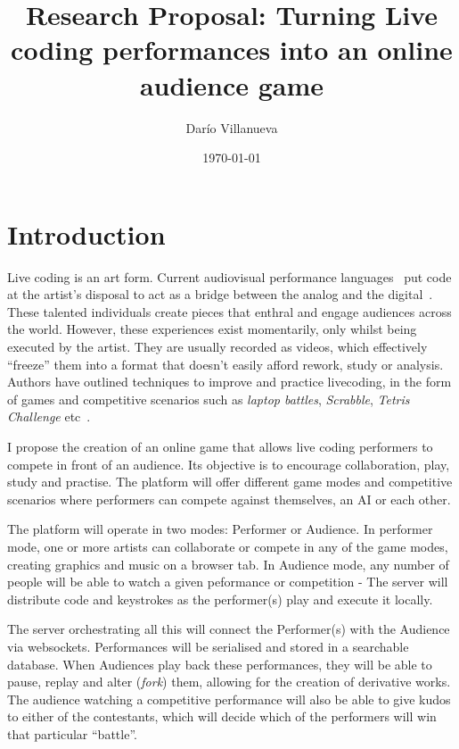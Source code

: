 \documentclass[12pt]{article}
\title{Research Proposal: Turning Live coding performances into an online audience game}
\date{\today}
\author{Darío Villanueva}
\begin{document}
\maketitle

\section*{Introduction}

Live coding is an art form. Current audiovisual performance languages~\cite{gibber, tidal, supercollider, livecodelab,fluxus} put code at the artist's disposal to act as a bridge between the analog and the digital~\cite{textural-x}. These talented individuals create pieces that enthral and engage audiences across the world. However, these experiences exist momentarily, only whilst being executed by the artist. They are usually recorded as videos, which effectively ``freeze'' them into a format that doesn't easily afford rework, study or analysis. Authors have outlined techniques to improve and practice livecoding, in the form of games and competitive scenarios such as \emph{laptop battles}, \emph{Scrabble}, \emph{Tetris Challenge} etc~\cite{laptop-performance, live-coding-practice}.

I propose the creation of an online game that allows live coding performers to compete in front of an audience. Its objective is to encourage collaboration, play, study and practise. The platform will offer different game modes and competitive scenarios where performers can compete against themselves, an AI or each other.

The platform will operate in two modes: Performer or Audience. In performer mode, one or more artists can collaborate or compete in any of the game modes, creating graphics and music on a browser tab. In Audience mode, any number of people will be able to watch a given peformance or competition - The server will distribute code and keystrokes as the performer(s) play and execute it locally.

The server orchestrating all this will connect the Performer(s) with the Audience via websockets. Performances will be serialised and stored in a searchable database. When Audiences play back these performances, they will be able to pause, replay and alter (\emph{fork}) them, allowing for the creation of derivative works. The audience watching a competitive performance will also be able to give kudos to either of the contestants, which will decide which of the performers will win that particular ``battle''.
\end{document}
